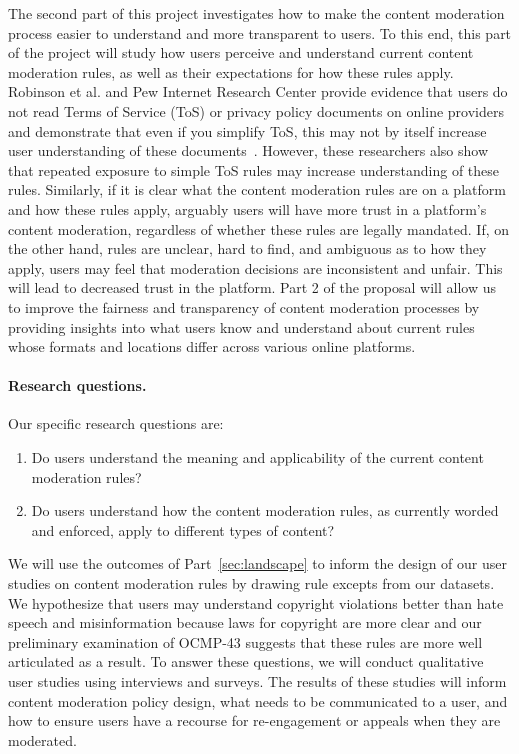 The second part of this project investigates how to make the content
moderation process easier to understand and more transparent to users. To this
end, this part of the project will study
how users perceive and understand current content moderation rules, as well as
their expectations for how these rules apply. Robinson et al. and Pew Internet
Research Center provide evidence that users do not read Terms of Service (ToS) or
privacy policy documents on online providers and demonstrate that even if you
simplify ToS, this may not by itself increase user understanding of these
documents~\cite{Robinson_Beyond_Agree_2020, PewPrivacyPolicyToS2019}. However,
these researchers also show that repeated exposure to simple ToS rules may
increase understanding of these rules. Similarly, if it is clear what
the content moderation rules are on a platform and how these rules apply,
arguably users will have more trust in a platform's content moderation,
regardless of whether these rules are legally mandated. If, on the other
hand, rules are unclear, hard to find, and ambiguous as to how they apply,
users may feel that moderation decisions are inconsistent and unfair. This
will lead to decreased trust in the platform. Part 2 of the proposal will
allow us to improve the fairness and transparency of content moderation
processes by providing insights into what users know and understand about
current rules whose formats and locations differ across various online
platforms. 

\paragraph{Research questions.}
Our specific research questions are:
\begin{enumerate}
    \item Do users understand the meaning and applicability of the current content moderation rules?
    \item Do users understand how the content moderation rules, as currently worded and enforced, apply to different types of content? 
\end{enumerate}
 
We will use the outcomes of Part~\ref{sec:landscape} to inform the design of our user studies on
content moderation rules by drawing rule excepts from our datasets. 
We hypothesize that
users may understand copyright violations better than hate
speech and misinformation because laws for copyright are more
clear and our preliminary examination of OCMP-43 suggests that these rules are more well articulated as a result. To answer these questions, we will conduct qualitative user studies using interviews and surveys. The results of these studies will inform content moderation
policy design, what needs to be communicated to a user, and how to ensure
users have a recourse for re-engagement or appeals when they are moderated. 

